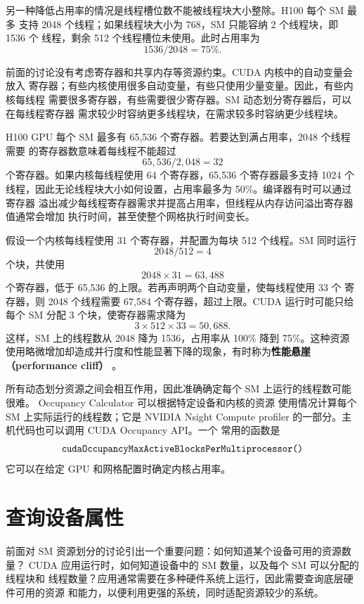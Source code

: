 另一种降低占用率的情况是线程槽位数不能被线程块大小整除。H100 每个 SM 最多
支持 2048 个线程；如果线程块大小为 768，SM 只能容纳 2 个线程块，即 1536 个
线程，剩余 512 个线程槽位未使用。此时占用率为
\[
  1536/2048=75\%.
\]

前面的讨论没有考虑寄存器和共享内存等资源约束。CUDA 内核中的自动变量会放入
寄存器；有些内核使用很多自动变量，有些只使用少量变量。因此，有些内核每线程
需要很多寄存器，有些需要很少寄存器。SM 动态划分寄存器后，可以在每线程寄存器
需求较少时容纳更多线程块，在需求较多时容纳更少线程块。

H100 GPU 每个 SM 最多有 65,536 个寄存器。若要达到满占用率，2048 个线程需要
的寄存器数意味着每线程不能超过
\[
  65{,}536/2{,}048=32
\]
个寄存器。如果内核每线程使用 64 个寄存器，65,536 个寄存器最多支持 1024 个
线程，因此无论线程块大小如何设置，占用率最多为 50\%。编译器有时可以通过寄存器
溢出减少每线程寄存器需求并提高占用率，但线程从内存访问溢出寄存器值通常会增加
执行时间，甚至使整个网格执行时间变长。

假设一个内核每线程使用 31 个寄存器，并配置为每块 512 个线程。SM 同时运行
\[
  2048/512=4
\]
个块，共使用
\[
  2048\times31=63{,}488
\]
个寄存器，低于 65,536 的上限。若再声明两个自动变量，使每线程使用 33 个
寄存器，则 2048 个线程需要 67,584 个寄存器，超过上限。CUDA 运行时可能只给
每个 SM 分配 3 个块，使寄存器需求降为
\[
  3\times512\times33=50{,}688.
\]
这样，SM 上的线程数从 2048 降为 1536，占用率从 100\% 降到 75\%。这种资源
使用略微增加却造成并行度和性能显著下降的现象，有时称为\textbf{性能悬崖
（performance cliff）} \cite{ryoo-4}。

所有动态划分资源之间会相互作用，因此准确确定每个 SM 上运行的线程数可能很难。
Occupancy Calculator \cite{occupancy-calculator-4} 可以根据特定设备和内核的资源
使用情况计算每个 SM 上实际运行的线程数；它是 NVIDIA Nsight Compute profiler
\cite{nsight-compute-4} 的一部分。主机代码也可以调用 CUDA Occupancy API。一个
常用的函数是
\[
\code{cudaOccupancyMaxActiveBlocksPerMultiprocessor()}
\]
它可以在给定 GPU 和网格配置时确定内核占用率。

\section{查询设备属性}
\label{sec:querying-device-properties}

前面对 SM 资源划分的讨论引出一个重要问题：如何知道某个设备可用的资源数量？
CUDA 应用运行时，如何知道设备中的 SM 数量，以及每个 SM 可以分配的线程块和
线程数量？应用通常需要在多种硬件系统上运行，因此需要查询底层硬件可用的资源
和能力，以便利用更强的系统，同时适配资源较少的系统。

